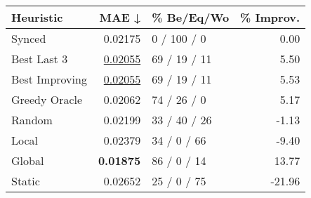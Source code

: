 \begin{tabular}{lrlr}
\toprule
\textbf{Heuristic} & \textbf{MAE ↓} & \textbf{\% Be/Eq/Wo} & \textbf{\% Improv.} \\
\midrule
            Synced &        0.02175 &          0 / 100 / 0 &                0.00 \\
\midrule
       Best Last 3 &        \underline{0.02055} &         69 / 19 / 11 &                5.50 \\
    Best Improving &        \underline{0.02055} &         69 / 19 / 11 &                5.53 \\
\addlinespace
     Greedy Oracle &        0.02062 &          74 / 26 / 0 &                5.17 \\
            Random &        0.02199 &         33 / 40 / 26 &               -1.13 \\
\midrule
             Local &        0.02379 &          34 / 0 / 66 &               -9.40 \\
            Global &        \textbf{0.01875} &          86 / 0 / 14 &               13.77 \\
\midrule
            Static &        0.02652 &          25 / 0 / 75 &              -21.96 \\
\bottomrule
\end{tabular}

\label{tab:iid_lr05_le2_bs4_Summary}
